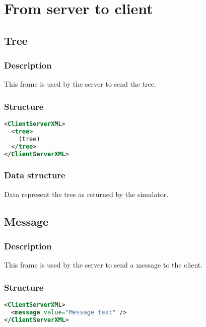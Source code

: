 \chapter{From server to client}

\section{Tree}
\label{tree}

\subsection{Description}

This frame is used by the server to send the tree.

\subsection{Structure}

\begin{lstlisting}[language=XML]
<ClientServerXML>
  <tree>
    (tree)
  </tree>
</ClientServerXML>
\end{lstlisting}

\subsection{Data structure}

Data represent the tree as returned by the simulator.


\section{Message}
\label{message}

\subsection{Description}

This frame is used by the server to send a message to the client.

\subsection{Structure}

\begin{lstlisting}[language=XML]
<ClientServerXML>
  <message value="Message text" />
</ClientServerXML>
\end{lstlisting}

